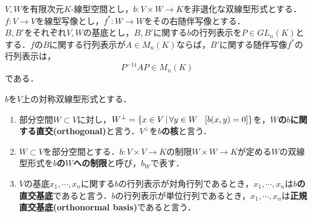 \documentclass[uplatex, 12pt, dvipdfmx]{jsreport}
\begin{document}
\begin{proposition}[転置と随伴関手]
    $V,W$を有限次元$K$-線型空間とし，$b:V\times W\longrightarrow K$を非退化な双線型形式とする．$f:V\longrightarrow V$を線型写像とし，$f^*:W\longrightarrow W$をその右随伴写像とする．\\
    $B,B'$をそれぞれ$V,W$の基底とし，$B,B'$に関する$b$の行列表示を$P\in GL_n(K)$とする．$f$の$B$に関する行列表示が$A\in M_n(K)$ならば，$B'$に関する随伴写像$f^*$の行列表示は，
    $$P^{-1}{}^tAP\in M_n(K)$$
    である．
\end{proposition}

\begin{definition}
    $b$を$V$上の対称双線型形式とする．
    \begin{enumerate}
        \item 部分空間$W\subset V$に対し，$W^\perp = \{ x\in V\,|\, \forall y\in W \hspace{3mm}[b(x,y)=0] \}$を，\textbf{$W$の$b$に関する直交(orthogonal)}と言う．$V^\perp$を\textbf{$b$の核}と言う．
        \item $W\subset V$を部分空間とする．$b:V\times V\longrightarrow K$の制限$W\times W\longrightarrow K$が定める$W$の双線型形式を\textbf{$b$の$W$への制限}と呼び，$b_W$で表す．
        \item $V$の基底$x_1,\cdots,x_n$に関する$b$の行列表示が対角行列であるとき，$x_1,\cdots,x_n$は\textbf{$b$の直交基底}であると言う．$b$の行列表示が単位行列であるとき，$x_1,\cdots,x_n$は\textbf{正規直交基底(orthonormal basis)}であると言う．
    \end{enumerate}
\end{definition}
\end{document}
